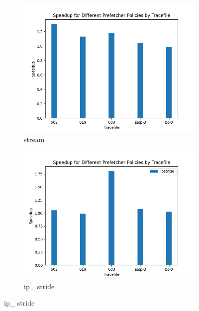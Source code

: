 \documentclass{article}
\begin{document}
\begin{figure}[h!]

\centering
\begin{subfigure}{0.5\textwidth}
  \centering
  \includegraphics[width=\linewidth]{stream_speedup.png}
  \caption{stream}
  \label{1a}
\end{subfigure}%
\begin{subfigure}{0.5\textwidth}
  \centering
  \includegraphics[width=\linewidth]{ip_speedup.png}
  \caption{ip\_ stride}
  \label{1b}
\end{subfigure}

\end{figure}
\end{document}
